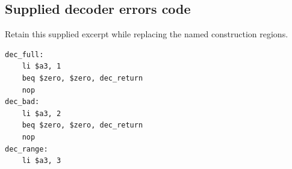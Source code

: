 \subsection*{Supplied decoder errors code}
Retain this supplied excerpt while replacing the named construction regions.
\begin{verbatim}
dec_full:
    li $a3, 1
    beq $zero, $zero, dec_return
    nop
dec_bad:
    li $a3, 2
    beq $zero, $zero, dec_return
    nop
dec_range:
    li $a3, 3
\end{verbatim}
